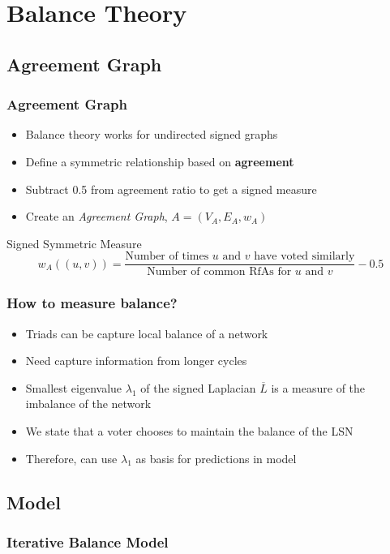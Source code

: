 \documentclass{beamer}
\begin{document}
\section{Balance Theory}

\subsection{Agreement Graph}
\begin{frame}
    \frametitle{Agreement Graph}
    \begin{itemize}
        \item Balance theory works for undirected signed graphs
        \item Define a symmetric relationship based on \textbf{agreement} 
        \item Subtract 0.5 from agreement ratio to get a signed measure
        \item Create an \textit{Agreement Graph}, $A=(V_A,E_A,w_A)$
    \end{itemize}
    \begin{block}{Signed Symmetric Measure}
        $$w_{A}((u,v)) = \frac{\text{Number of times } u \text{ and } v \text{ have voted similarly}}{\text{Number of common RfAs for } u \text{ and } v} -0.5$$
    \end{block}

\end{frame}

\begin{frame}
    \frametitle{How to measure balance?}
    \begin{itemize}
        \item Triads can be capture local balance of a network
        \item Need capture information from longer cycles \cite{chiang2011exploiting}
        \item Smallest eigenvalue $\lambda_{1}$ of the signed Laplacian $\overline{L}$ is a measure of the imbalance of the network \cite{hou2005bounds}
        \item  We state that a voter chooses to maintain the balance of the LSN
        \item Therefore, can use $\lambda_{1}$ as basis for predictions in model
    \end{itemize}
    

\end{frame}
\subsection{Model}
\begin{frame}
    \frametitle{Iterative Balance Model}
    \centering
    \scalebox{0.7}{}

\end{frame}
\end{document}
